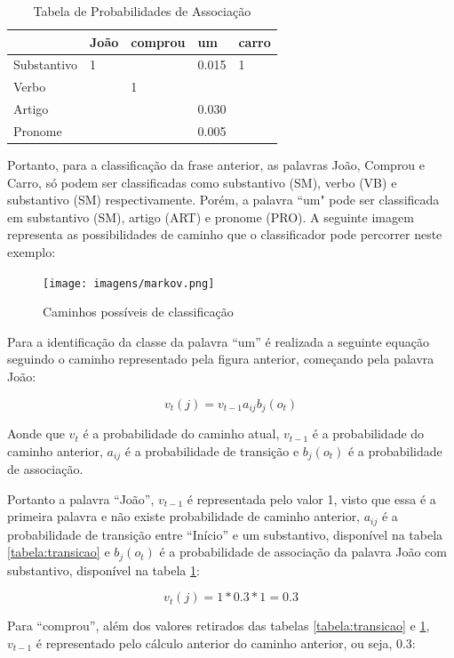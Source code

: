 \begin{table}[htb]
\centering
\begin{tabular}{|l|l|l|l|l|}
\hline
            & João & comprou & um    & carro \\ \hline
Substantivo & 1    &         & 0.015 & 1     \\ \hline
Verbo       &      & 1       &       &       \\ \hline
Artigo      &      &         & 0.030 &       \\ \hline
Pronome     &      &         & 0.005 &       \\ \hline
\end{tabular}
\caption{Tabela de Probabilidades de Associação}
\label{tabela:associacao}
\end{table}


Portanto, para a classificação da frase anterior, as palavras João, Comprou
e Carro, só podem ser classificadas como substantivo (SM), verbo (VB) e
substantivo (SM) respectivamente. Porém, a palavra ``um" pode ser classificada
em substantivo (SM), artigo (ART) e pronome (PRO). A seguinte imagem representa
as possibilidades de caminho que o classificador pode percorrer neste exemplo:

\begin{figure}[htbp]
 \centering
 \texttt{[image: imagens/markov.png]}
 \caption{Caminhos possíveis de classificação}
 \label{fig:markov}
\end{figure}

\newpage
Para a identificação da classe da palavra ``um'' é realizada a seguinte equação
seguindo o caminho representado pela figura anterior, começando pela palavra
João:

\[ v_t(j) = v_{t-1} a_{ij} b_j(o_t) \]

Aonde que $v_t$ é a probabilidade do caminho atual, $v_{t-1}$ é a
probabilidade do caminho anterior, $a_{ij}$ é a probabilidade de transição e $b_j(o_t)$ é a
probabilidade de associação.

Portanto a palavra ``João'', $v_{t-1}$ é representada pelo valor 1, visto
que essa é a primeira palavra e não existe probabilidade de caminho
anterior, $a_{ij}$ é a probabilidade de transição entre ``Início'' e um
substantivo, disponível na tabela \ref{tabela:transicao} e $b_j(o_t)$ é
a probabilidade de associação da palavra João com substantivo, disponível na
tabela \ref{tabela:associacao}:

\[ v_t(j) = 1 * 0.3 * 1 = 0.3 \]

Para ``comprou'', além dos valores retirados das tabelas \ref{tabela:transicao}
e \ref{tabela:associacao}, $v_{t-1}$ é representado pelo cálculo anterior do
caminho anterior, ou seja, 0.3:

